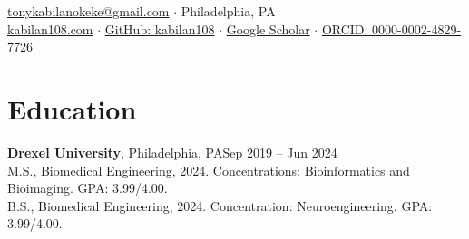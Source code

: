 \documentclass[11pt,letterpaper]{article}
\begin{document}
{\par
\href{mailto:tonykabilanokeke@gmail.com}{tonykabilanokeke@gmail.com} $\cdot$ Philadelphia, PA\\
\href{https://kabilan108.com}{kabilan108.com} $\cdot$ \href{https://github.com/kabilan108}{GitHub: kabilan108} $\cdot$ \href{https://scholar.google.com/citations?user=kPKT6SsAAAAJ}{Google Scholar} $\cdot$ \href{https://orcid.org/0000-0002-4829-7726}{ORCID: 0000-0002-4829-7726}\par}

\section{Education}
\textbf{Drexel University}, Philadelphia, PA\hfill Sep 2019 -- Jun 2024\\
M.S., Biomedical Engineering, 2024. Concentrations: Bioinformatics and Bioimaging. GPA: 3.99/4.00.\\
B.S., Biomedical Engineering, 2024. Concentration: Neuroengineering. GPA: 3.99/4.00.
\end{document}
